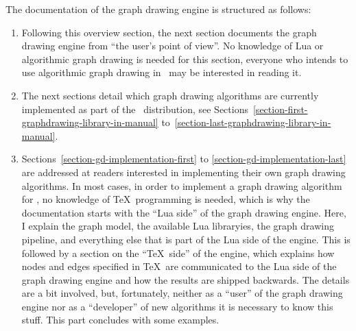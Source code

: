 The documentation of the graph drawing engine is structured as
follows:
\begin{enumerate}
\item Following this overview section, the next section documents
  the graph drawing engine from ``the user's point of view''. No
  knowledge of Lua or algorithmic graph drawing is needed for this
  section, everyone who intends to use algorithmic graph drawing in
  \tikzname\ may be interested in reading it.
\item The next sections detail which graph drawing algorithms are
  currently implemented as part of the \tikzname\ distribution, see
  Sections~\ref{section-first-graphdrawing-library-in-manual}
  to~\ref{section-last-graphdrawing-library-in-manual}.
\item Sections~\ref{section-gd-implementation-first} to
  \ref{section-gd-implementation-last} are addressed at readers
  interested in implementing their own graph drawing
  algorithms. In most cases, in order to implement a graph drawing
  algorithm for \tikzname, no knowledge of \TeX\ programming is
  needed, which is why the documentation starts with the ``Lua side''
  of the graph drawing engine. Here, I explain the graph model, the
  available Lua libraryies, the graph drawing pipeline, and everything
  else that is part of the Lua side of the engine. This is followed by
  a section on the ``\TeX\ side'' of the engine, which explains how
  nodes and edges specified in \TeX\ are communicated to the Lua side
  of the graph drawing engine and how the results are shipped
  backwards. The details are a bit involved, but, fortunately, neither
  as a ``user'' of the graph drawing engine nor as a ``developer'' of
  new algorithms it is necessary to know this stuff. This part
  concludes with some examples.
\end{enumerate}
